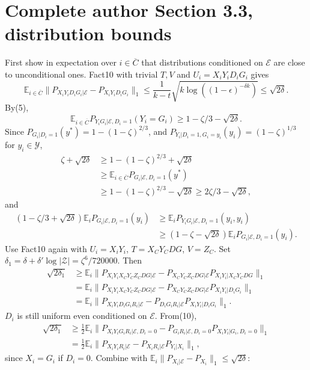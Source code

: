 \documentclass[10pt,a4paper]{article}
\begin{document}
\section*{Complete author Section 3.3, distribution bounds}
First show in expectation over $i\in\overline C$ that distributions conditioned on $\mathcal E$ are close to unconditional ones. Fact10 with trivial $T,V$ and $U_i=X_iY_iD_iG_i$ gives
\[\mathbb E_{i\in\overline C}\|P_{X_iY_iD_iG_i|\mathcal E}-P_{X_iY_iD_iG_i}\|_1\le\frac1{k-t}\sqrt{k\log((1-\epsilon)^{-\delta k})}\le\sqrt{2\delta}.\tag{6}\]
By(5),
\[\mathbb E_{i\in\overline C}P_{Y_iG_i|\mathcal E,D_i=1}(Y_i=G_i)\ge1-\zeta/3-\sqrt{2\delta}.\tag{7}\]
Since $P_{G_i|D_i=1}(y^*)=1-(1-\zeta)^{2/3}$, and $P_{Y_i|D_i=1,G_i=y_i}(y_i)=(1-\zeta)^{1/3}$ for $y_i\in\mathcal Y$,
\begin{align*}\zeta+\sqrt{2\delta}&\ge1-(1-\zeta)^{2/3}+\sqrt{2\delta}\\&\ge\mathbb E_{i\in\overline C}P_{G_i|\mathcal E,D_i=1}(y^*)\\&\ge1-(1-\zeta)^{2/3}-\sqrt{2\delta}\ge2\zeta/3-\sqrt{2\delta},\tag{8}\end{align*}
and
\begin{align*}(1-\zeta/3+\sqrt{2\delta})\mathbb E_iP_{G_i|\mathcal E,D_i=1}(y_i)&\ge\mathbb E_iP_{Y_iG_i|\mathcal E,D_i=1}(y_i,y_i)\\&\ge(1-\zeta-\sqrt{2\delta})\mathbb E_iP_{G_i|\mathcal E,D_i=1}(y_i).\tag{9}\end{align*}
Use Fact10 again with $U_i=X_iY_i$, $T=X_CY_CDG$, $V=Z_C$. Set $\delta_1=\delta+\delta'\log|\mathcal Z|=\zeta^6/720000$. Then
\begin{align*}\sqrt{2\delta_1}&\ge\mathbb E_i\|P_{X_iY_iX_CY_CZ_CDG|\mathcal E}-P_{X_CY_CZ_CDG|\mathcal E}P_{X_iY_i|X_CY_CDG}\|_1\\&=\mathbb E_i\|P_{X_iY_iX_CY_CZ_CDG|\mathcal E}-P_{X_CY_CZ_CDG|\mathcal E}P_{X_iY_i|D_iG_i}\|_1\\&=\mathbb E_i\|P_{X_iY_iD_iG_iR_i|\mathcal E}-P_{D_iG_iR_i|\mathcal E}P_{X_iY_i|D_iG_i}\|_1.\tag{10}\end{align*}
$D_i$ is still uniform even conditioned on $\mathcal E$. From(10),
\begin{align*}\sqrt{2\delta_1}&\ge\tfrac12\mathbb E_i\|P_{X_iY_iG_iR_i|\mathcal E,D_i=0}-P_{G_iR_i|\mathcal E,D_i=0}P_{X_iY_i|G_i,D_i=0}\|_1\\&=\tfrac12\mathbb E_i\|P_{X_iY_iR_i|\mathcal E}-P_{X_iR_i|\mathcal E}P_{Y_i|X_i}\|_1,\end{align*}
since $X_i=G_i$ if $D_i=0$. Combine with $\mathbb E_i\|P_{X_i|\mathcal E}-P_{X_i}\|_1\le\sqrt{2\delta}$:
\end{document}
